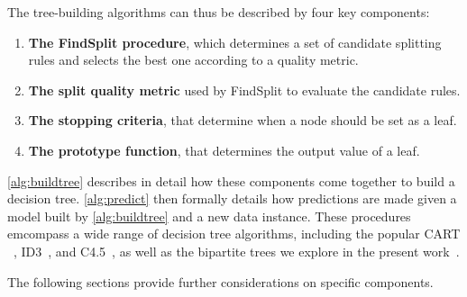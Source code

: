The tree-building algorithms can thus be described by four key components:
%
\begin{enumerate}
    \item \textbf{The FindSplit procedure}, which determines a set of candidate splitting rules and selects the best one according to a quality metric.
    \item \textbf{The split quality metric} used by FindSplit to evaluate the candidate rules.
    \item \textbf{The stopping criteria}, that determine when a node should be set as a leaf.
    \item \textbf{The prototype function}, that determines the output value of a leaf.
\end{enumerate}
%
\autoref{alg:buildtree} describes in detail how these components come together to build a decision tree. \autoref{alg:predict} then formally details how predictions are made given a model built by \autoref{alg:buildtree} and a new data instance.
%
These procedures emcompass a wide range of decision tree algorithms, including the popular CART ~\cite{breiman1984classification}, ID3~\cite{quinlan1986induction}, and C4.5~\cite{quinlan2014c4}, as well as the bipartite trees we explore in the present work~\cite{pliakos2018global}.  %

The following sections provide further considerations on specific components.

\algPredict
\algBuildTree


%

